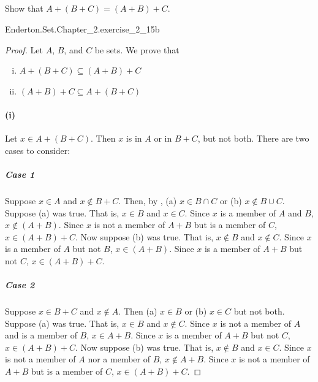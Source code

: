 \documentclass{report}
\begin{document}
\subsection{}%

  Show that $A + (B + C) = (A + B) + C$.

    {Enderton.Set.Chapter\_2.exercise\_2\_15b}


  \begin{proof}
    Let $A$, $B$, and $C$ be sets.
    We prove that
      \begin{enumerate}[(i)]
        \item $A + (B + C) \subseteq (A + B) + C$
        \item $(A + B) + C \subseteq A + (B + C)$
      \end{enumerate}

    \paragraph{(i)}%

      Let $x \in A + (B + C)$.
      Then $x$ is in $A$ or in $B + C$, but not both.
      There are two cases to consider:

      \subparagraph{Case 1}%

        Suppose $x \in A$ and $x \not\in B + C$.
        Then, by ,
          (a) $x \in B \cap C$ or (b) $x \not\in B \cup C$.
        Suppose (a) was true.
        That is, $x \in B$ and $x \in C$.
        Since $x$ is a member of $A$ and $B$, $x \not\in (A + B)$.
        Since $x$ is not a member of $A + B$ but is a member of $C$,
          $x \in (A + B) + C$.
        Now suppose (b) was true.
        That is, $x \not\in B$ and $x \not\in C$.
        Since $x$ is a member of $A$ but not $B$, $x \in (A + B)$.
        Since $x$ is a member of $A + B$ but not $C$, $x \in (A + B) + C$.

      \subparagraph{Case 2}%

        Suppose $x \in B + C$ and $x \not\in A$.
        Then (a) $x \in B$ or (b) $x \in C$ but not both.
        Suppose (a) was true.
        That is, $x \in B$ and $x \not\in C$.
        Since $x$ is not a member of $A$ and is a member of $B$, $x \in A + B$.
        Since $x$ is a member of $A + B$ but not $C$, $x \in (A + B) + C$.
        Now suppose (b) was true.
        That is, $x \not\in B$ and $x \in C$.
        Since $x$ is not a member of $A$ nor a member of $B$, $x \not\in A + B$.
        Since $x$ is not a member of $A + B$ but is a member of $C$,
          $x \in (A + B) + C$.


\end{proof}
\end{document}

